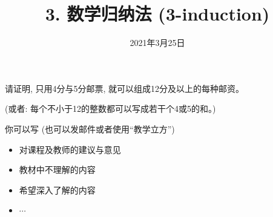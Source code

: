 \documentclass[a4paper, justified]{tufte-handout}
\title{3. 数学归纳法 (3-induction)}
\date{2021年3月25日}
\begin{document}
\maketitle
\noplagiarism %
\begin{abstract}
\end{abstract}
\beginrequired

\begin{problem}
  请证明, 只用4分与5分邮票, 就可以组成12分及以上的每种邮资。

  \noindent (或者: 每个不小于12的整数都可以写成若干个4或5的和。)
\end{problem}

\begin{solution}
\end{solution}

\begin{problem}
\end{problem}

\begin{solution}
\end{solution}

\begin{problem}
\end{problem}

\begin{solution}
\end{solution}


\begincorrection

\beginfb

你可以写 (也可以发邮件或者使用``教学立方'')
\begin{itemize}
  \item 对课程及教师的建议与意见
  \item 教材中不理解的内容
  \item 希望深入了解的内容
  \item $\cdots$
\end{itemize}
\end{document}
